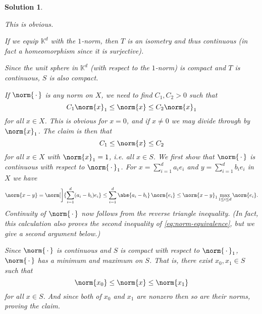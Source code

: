 \documentclass[article, a4paper, 11pt, oneside]{memoir}
\numberwithin{equation}{chapter}
\newcommand{\bbK}{\mathbb{K}}
\theoremstyle{nonumberplain}
\newtheorem{solution}{Solution}
\begin{document}
\begin{solution}
\begin{solutionsec}
	\item This is obvious.
	
	\item If we equip $\bbK^d$ with the $1$-norm, then $T$ is an isometry and thus continuous (in fact a homeomorphism since it is surjective).

	\item Since the unit sphere in $\bbK^d$ (with respect to the $1$-norm) is compact and $T$ is continuous, $S$ is also compact.

	\item If $\norm{\,\cdot\,}$ is any norm on $X$, we need to find $C_1,C_2 > 0$ such that
	\begin{equation}
		\label{eq:norm-equivalence}
		C_1 \norm{x}_1
			\leq \norm{x}
			\leq C_2 \norm{x}_1
	\end{equation}
	for all $x \in X$. This is obvious for $x = 0$, and if $x \neq 0$ we may divide through by $\norm{x}_1$. The claim is then that
	\begin{equation*}
		C_1
			\leq \norm{x}
			\leq C_2
	\end{equation*}
	for all $x \in X$ with $\norm{x}_1 = 1$, i.e. all $x \in S$. We first show that $\norm{\,\cdot\,}$ is continuous with respect to $\norm{\,\cdot\,}_1$. For $x = \sum_{i=1}^d a_i e_i$ and $y = \sum_{i=1}^d b_i e_i$ in $X$ we have
	\begin{equation*}
		\norm{x-y}
			= \norm[\bigg]{ \sum_{i=1}^d (a_i - b_i) e_i }
			\leq \sum_{i=1}^d \abs{a_i - b_i} \, \norm{e_i}
			\leq \norm{x-y}_1 \max_{1 \leq i \leq d} \norm{e_i}.
	\end{equation*}
	Continuity of $\norm{\,\cdot\,}$ now follows from the reverse triangle inequality. (In fact, this calculation also proves the second inequality of \cref{eq:norm-equivalence}, but we give a second argument below.)

	Since $\norm{\,\cdot\,}$ is continuous and $S$ is compact with respect to $\norm{\,\cdot\,}_1$, $\norm{\,\cdot\,}$ has a minimum and maximum on $S$. That is, there exist $x_0, x_1 \in S$ such that
	\begin{equation*}
		\norm{x_0}
			\leq \norm{x}
			\leq \norm{x_1}
	\end{equation*}
	for all $x \in S$. And since both of $x_0$ and $x_1$ are nonzero then so are their norms, proving the claim.
\end{solutionsec}
\end{solution}
\end{document}
